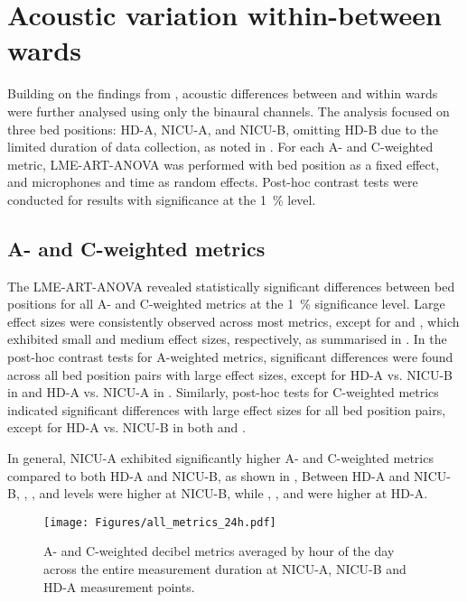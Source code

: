 \section{Acoustic variation within-between wards}
\label{sec:diff_loc}

Building on the findings from , acoustic differences between and within wards were further analysed using only the binaural channels. The analysis focused on three bed positions: HD-A, NICU-A, and NICU-B, omitting HD-B due to the limited duration of data collection, as noted in . For each A- and C-weighted metric, LME-ART-ANOVA was performed with bed position as a fixed effect, and microphones and time as random effects. Post-hoc contrast tests were conducted for results with significance at the \SI{1}{\percent} level.

\subsection{A- and C-weighted metrics}

The LME-ART-ANOVA revealed statistically significant differences between bed positions for all A- and C-weighted metrics at the \SI{1}{\percent} significance level. Large effect sizes were consistently observed across most metrics, except for  and , which exhibited small and medium effect sizes, respectively, as summarised in . In the post-hoc contrast tests for A-weighted metrics, significant differences were found across all bed position pairs with large effect sizes, except for HD-A vs. NICU-B in  and HD-A vs. NICU-A in . Similarly, post-hoc tests for C-weighted metrics indicated significant differences with large effect sizes for all bed position pairs, except for HD-A vs. NICU-B in both  and .

In general, NICU-A exhibited significantly higher A- and C-weighted metrics compared to both HD-A and NICU-B, as shown in , Between HD-A and NICU-B, , , and  levels were higher at NICU-B, while , , and  were higher at HD-A.

\begin{figure*}[h]
    \centering
    \texttt{[image: Figures/all\_metrics\_24h.pdf]}
    \caption{A- and C-weighted decibel metrics averaged by hour of the day across the entire measurement duration at NICU-A, NICU-B and HD-A measurement points.}
    \label{fig:byhourmetrics}
\end{figure*}

